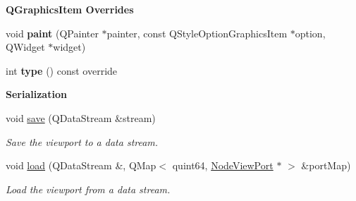 \begin{Indent}\textbf{ Q\+Graphics\+Item Overrides}\par
\begin{DoxyCompactItemize}
\item 
\mbox{\label{classrev_1_1_view_1_1_node_view_block_a066876c7ecf6fa0717b50fe2d11c6f46}} 
void {\bfseries paint} (Q\+Painter $\ast$painter, const Q\+Style\+Option\+Graphics\+Item $\ast$option, Q\+Widget $\ast$widget)
\item 
\mbox{\label{classrev_1_1_view_1_1_node_view_block_a54a4eac54d1e78394eb6afa565f60cff}} 
int {\bfseries type} () const override
\end{DoxyCompactItemize}
\end{Indent}
\begin{Indent}\textbf{ Serialization}\par
\begin{DoxyCompactItemize}
\item 
\mbox{\label{classrev_1_1_view_1_1_node_view_block_a773748834fffe74b45a7f9da4a9d7fbc}} 
void \mbox{\hyperlink{classrev_1_1_view_1_1_node_view_block_a773748834fffe74b45a7f9da4a9d7fbc}{save}} (Q\+Data\+Stream \&stream)
\begin{DoxyCompactList}\small\item\em Save the viewport to a data stream. \end{DoxyCompactList}\item 
\mbox{\label{classrev_1_1_view_1_1_node_view_block_a07c85af4819d781da78d8a32be28b104}} 
void \mbox{\hyperlink{classrev_1_1_view_1_1_node_view_block_a07c85af4819d781da78d8a32be28b104}{load}} (Q\+Data\+Stream \&, Q\+Map$<$ quint64, \mbox{\hyperlink{classrev_1_1_view_1_1_node_view_port}{Node\+View\+Port}} $\ast$ $>$ \&port\+Map)
\begin{DoxyCompactList}\small\item\em Load the viewport from a data stream. \end{DoxyCompactList}\end{DoxyCompactItemize}
\end{Indent}
